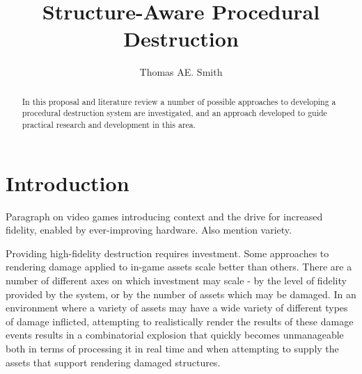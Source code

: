 \documentclass[11pt]{report}
\title{Structure-Aware Procedural Destruction} \author{Thomas AE. Smith}
\begin{document}
\maketitle

\begin{abstract} %
	In this proposal and literature review a number of possible approaches to developing a procedural destruction system are investigated, and an approach developed to guide practical research and development in this area.
\end{abstract}


\chapter{Introduction}
	Paragraph on video games introducing context and the drive for increased fidelity, enabled by ever-improving hardware. Also mention variety.

	Providing high-fidelity destruction requires investment. Some approaches to rendering damage applied to in-game assets scale better than others. There are a number of different axes on which investment may scale - by the level of fidelity provided by the system, or by the number of assets which may be damaged. In an environment where a variety of assets may have a wide variety of different types of damage inflicted, attempting to realistically render the results of these damage events results in a combinatorial explosion that quickly becomes unmanageable both in terms of processing it in real time and when attempting to supply the assets that support rendering damaged structures.
\end{document}
